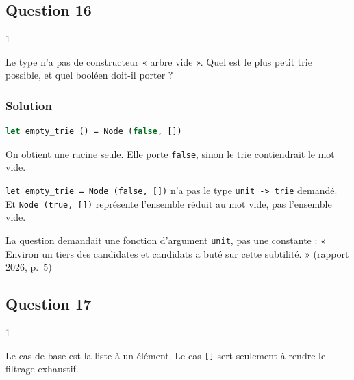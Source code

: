 \documentclass[11pt,a4paper]{article}
\begin{document}
\hypertarget{question-16}{%
\subsection{Question 16}\label{question-16}}

\begin{indication}{1}

Le type n'a pas de constructeur « arbre vide ». Quel est le plus petit trie possible, et quel booléen doit-il porter ?

\end{indication}

\hypertarget{solution-15}{%
\subsubsection{Solution}\label{solution-15}}

\begin{lstlisting}[language=Caml]
let empty_trie () = Node (false, [])
\end{lstlisting}

On obtient une racine seule. Elle porte \texttt{false}, sinon le trie contiendrait le mot vide.

\begin{piege}

\texttt{let\ empty\_trie\ =\allowbreak{}\ Node\ (\allowbreak{}false,\allowbreak{}\ {[}{]}\allowbreak{})\allowbreak{}} n'a pas le type \texttt{unit\ -\textgreater{}\ trie} demandé. Et \texttt{Node\ (true,\ {[}{]})} représente l'ensemble réduit au mot vide, pas l'ensemble vide.

\end{piege}

\begin{jury}

La question demandait une fonction d'argument \texttt{unit}, pas une constante : « Environ un tiers des candidates et candidats a buté sur cette subtilité. » (rapport 2026, p.~5)

\end{jury}

\hypertarget{question-17}{%
\subsection{Question 17}\label{question-17}}

\begin{indication}{1}

Le cas de base est la liste à un élément. Le cas \texttt{{[}{]}} sert seulement à rendre le filtrage exhaustif.

\end{indication}
\end{document}
